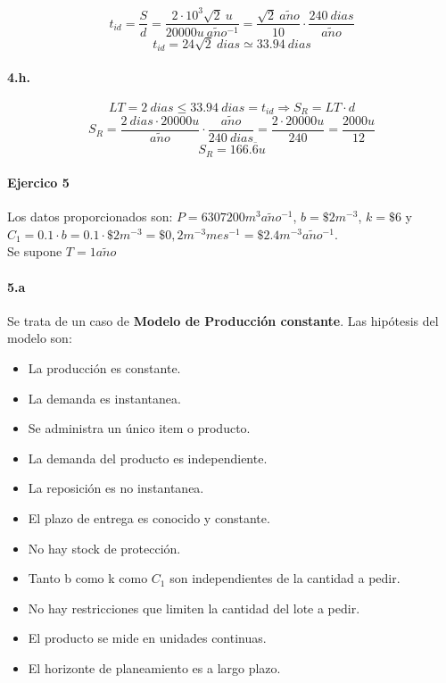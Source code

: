 \documentclass{article}
\def \anio {a\tilde{n}o}
\begin{document}
        $$ t_{id} = \frac{S}{d} = \frac{2 \cdot 10^3 \sqrt {2}\ u}{20000u\ \anio^{-1}} = \frac{\sqrt{2}\ \anio}{10} \cdot \frac{240\ dias}{\anio} $$
        $$ \boxed{ t_{id} = 24\sqrt{2}\ dias \simeq 33.94\ dias } $$
    
    \paragraph{4.h.}
        $$ LT = 2\ dias \leq 33.94\ dias = t_{id} \Rightarrow S_R = LT \cdot d $$
        $$ S_R = \frac{2\ dias \cdot 20000u}{\anio} \cdot \frac{\anio}{240\ dias} = \frac{2 \cdot 20000u}{240} = \frac{2000u}{12} $$
        $$ \boxed{S_R = 166.\overline{6} u} $$


\paragraph{Ejercico 5}
Los datos proporcionados son: $P = 6307200 m^3 \anio^{-1} $, $b = \$2 m^{-3} $, $k = \$6 $ y $C_1 = 0.1 \cdot b = 0.1 \cdot \$2 m^{-3} = \$0,2 m^{-3}mes^{-1} = \$2.4 m^{-3}\anio^{-1} $. \\
Se supone $T = 1 \anio$
  \paragraph{5.a}
  Se trata de un caso de {\bf Modelo de Producci\'on constante}. Las hip\'otesis del modelo son:
 \begin{itemize}
  \item La producci\'on es constante.
  \item La demanda es instantanea.
  \item Se administra un \'unico item o producto.
  \item La demanda del producto es independiente.
  \item La reposici\'on es no instantanea.
  \item El plazo de entrega es conocido y constante.
  \item No hay stock de protecci\'on.
  \item Tanto b como k como $ C_1 $ son independientes de la cantidad a pedir.
  \item No hay restricciones que limiten la cantidad del lote a pedir.
  \item El producto se mide en unidades continuas.
  \item El horizonte de planeamiento es a largo plazo.
 \end{itemize}
\end{document}
